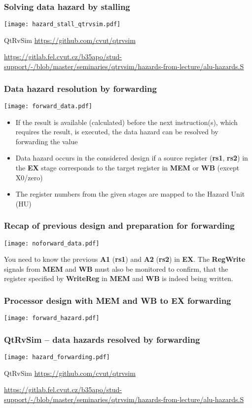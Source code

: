 \documentclass{beamer}
\begin{document}
\begin{frame}
\frametitle{Solving data hazard by stalling}
\texttt{[image: hazard\_stall\_qtrvsim.pdf]}

{\tiny
QtRvSim \url{https://github.com/cvut/qtrvsim}
}

{\Tiny
\url{https://gitlab.fel.cvut.cz/b35apo/stud-support/-/blob/master/seminaries/qtrvsim/hazards-from-lecture/alu-hazards.S}
}

\end{frame}


\begin{frame}
\frametitle{Data hazard resolution by forwarding}
\texttt{[image: forward\_data.pdf]}

\begin{itemize}
 \item If the result is available (calculated) before the next instruction(s), which requires the result, is executed, the data hazard can be resolved by forwarding the value
 \item Data hazard occurs in the considered design if a source register
       (\textbf{rs1}, \textbf{rs2}) in the \textbf{EX} stage corresponds to the target register
       in \textbf{MEM} or \textbf{WB} (except X0/zero)
 \item The register numbers from the given stages are mapped to the Hazard Unit (HU)
\end{itemize}

\end{frame}

\begin{frame}
\frametitle{Recap of previous design and preparation for forwarding}
\texttt{[image: noforward\_data.pdf]}

You need to know the previous \textbf{A1} (\textbf{rs1}) and \textbf{A2} (\textbf{rs2}) in \textbf{EX}.
The \textbf{RegWrite} signals from \textbf{MEM} and \textbf{WB} must also be monitored to confirm,
that the register specified by \textbf{WriteReg} in \textbf{MEM} and \textbf{WB} is indeed being written.

\end{frame}

\begin{frame}
\frametitle{Processor design with MEM and WB to EX forwarding}
\texttt{[image: forward\_hazard.pdf]}
\end{frame}

\begin{frame}
\frametitle{QtRvSim -- data hazards resolved by forwarding}
\texttt{[image: hazard\_forwarding.pdf]}

{\tiny
QtRvSim \url{https://github.com/cvut/qtrvsim}
}

{\Tiny
\url{https://gitlab.fel.cvut.cz/b35apo/stud-support/-/blob/master/seminaries/qtrvsim/hazards-from-lecture/alu-hazards.S}
}

\end{frame}
\end{document}

